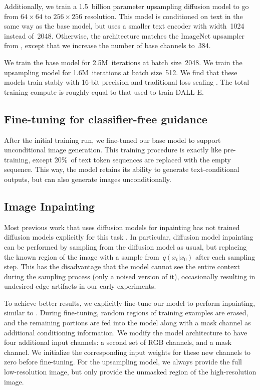 Additionally, we train a 1.5~billion parameter upsampling diffusion model to go from $64 \times 64$ to $256 \times 256$ resolution. This model is conditioned on text in the same way as the base model, but uses a smaller text encoder with width~1024 instead of~2048. Otherwise, the architecture matches the ImageNet upsampler from \citet{sotapaper}, except that we increase the number of base channels to~384.

We train the base model for 2.5M~iterations at batch size~2048. We train the upsampling model for 1.6M~iterations at batch size~512. We find that these models train stably with 16-bit precision and traditional loss scaling \citep{lossscaling}. The total training compute is roughly equal to that used to train DALL-E.

\subsection{Fine-tuning for classifier-free guidance}

After the initial training run, we fine-tuned our base model to support unconditional image generation. This training procedure is exactly like pre-training, except 20\%~of text token sequences are replaced with the empty sequence. This way, the model retains its ability to generate text-conditional outputs, but can also generate images unconditionally.

\subsection{Image Inpainting}

Most previous work that uses diffusion models for inpainting has not trained diffusion models explicitly for this task \citep{dickstein,sde,sdedit}. In particular, diffusion model inpainting can be performed by sampling from the diffusion model as usual, but replacing the known region of the image with a sample from~$q(x_t|x_0)$ after each sampling step. This has the disadvantage that the model cannot see the entire context during the sampling process (only a noised version of it), occasionally resulting in undesired edge artifacts in our early experiments.

To achieve better results, we explicitly fine-tune our model to perform inpainting, similar to \citet{palette}. During fine-tuning, random regions of training examples are erased, and the remaining portions are fed into the model along with a mask channel as additional conditioning information. We modify the model architecture to have four additional input channels: a second set of RGB channels, and a mask channel. We initialize the corresponding input weights for these new channels to zero before fine-tuning. For the upsampling model, we always provide the full low-resolution image, but only provide the unmasked region of the high-resolution image.


